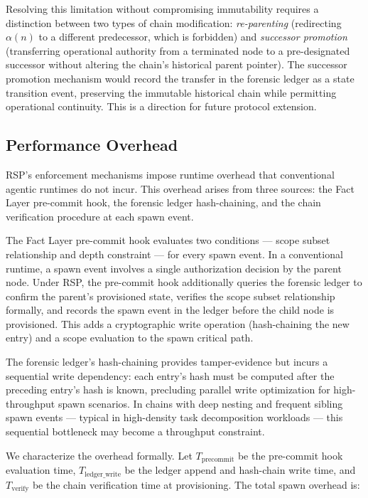 Resolving this limitation without compromising immutability requires a distinction between two types of chain modification: \emph{re-parenting} (redirecting $\alpha(n)$ to a different predecessor, which is forbidden) and \emph{successor promotion} (transferring operational authority from a terminated node to a pre-designated successor without altering the chain's historical parent pointer). The successor promotion mechanism would record the transfer in the forensic ledger as a state transition event, preserving the immutable historical chain while permitting operational continuity. This is a direction for future protocol extension.

\subsection{Performance Overhead}
\label{sec:rs-limitations-overhead}

RSP's enforcement mechanisms impose runtime overhead that conventional agentic runtimes do not incur. This overhead arises from three sources: the Fact Layer pre-commit hook, the forensic ledger hash-chaining, and the chain verification procedure at each spawn event.

The Fact Layer pre-commit hook evaluates two conditions — scope subset relationship and depth constraint — for every spawn event. In a conventional runtime, a spawn event involves a single authorization decision by the parent node. Under RSP, the pre-commit hook additionally queries the forensic ledger to confirm the parent's provisioned state, verifies the scope subset relationship formally, and records the spawn event in the ledger before the child node is provisioned. This adds a cryptographic write operation (hash-chaining the new entry) and a scope evaluation to the spawn critical path.

The forensic ledger's hash-chaining provides tamper-evidence but incurs a sequential write dependency: each entry's hash must be computed after the preceding entry's hash is known, precluding parallel write optimization for high-throughput spawn scenarios. In chains with deep nesting and frequent sibling spawn events — typical in high-density task decomposition workloads — this sequential bottleneck may become a throughput constraint.

We characterize the overhead formally. Let $T_{\mathrm{precommit}}$ be the pre-commit hook evaluation time, $T_{\mathrm{ledger\_write}}$ be the ledger append and hash-chain write time, and $T_{\mathrm{verify}}$ be the chain verification time at provisioning. The total spawn overhead is:

